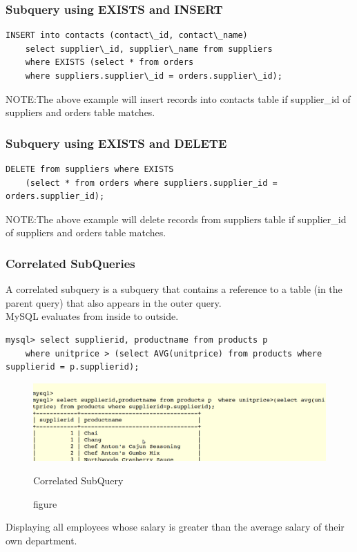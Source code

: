 \documentclass[11pt,a4paper]{article}
\begin{document}
\subsubsection*{Subquery using EXISTS and INSERT}
\begin{verbatim}INSERT into contacts (contact\_id, contact\_name) 
    select supplier\_id, supplier\_name from suppliers 
    where EXISTS (select * from orders 
    where suppliers.supplier\_id = orders.supplier\_id);\end{verbatim}
NOTE:The above example will insert records into contacts table if supplier\_id of suppliers and orders table matches.                                                                
\subsubsection*{Subquery using EXISTS and DELETE}
\begin{verbatim}DELETE from suppliers where EXISTS 
    (select * from orders where suppliers.supplier_id = orders.supplier_id);\end{verbatim}
NOTE:The above example will delete records from suppliers table if supplier\_id of suppliers and orders table matches.                                                        

\subsubsection*{Correlated SubQueries}
A correlated subquery is a subquery that contains a reference to a table (in the parent query) that also appears in the outer query.\\
MySQL evaluates from inside to outside.
\begin{verbatim}
mysql> select supplierid, productname from products p 
    where unitprice > (select AVG(unitprice) from products where supplierid = p.supplierid);\end{verbatim}
\begin{figure}[ht]
\begin{center}
\includegraphics[scale=0.2]{corel.png}
\caption{figure}{Correlated SubQuery}
\end{center}
\end{figure}
Displaying all employees whose salary is greater than the average salary of their own department.
\end{document}

